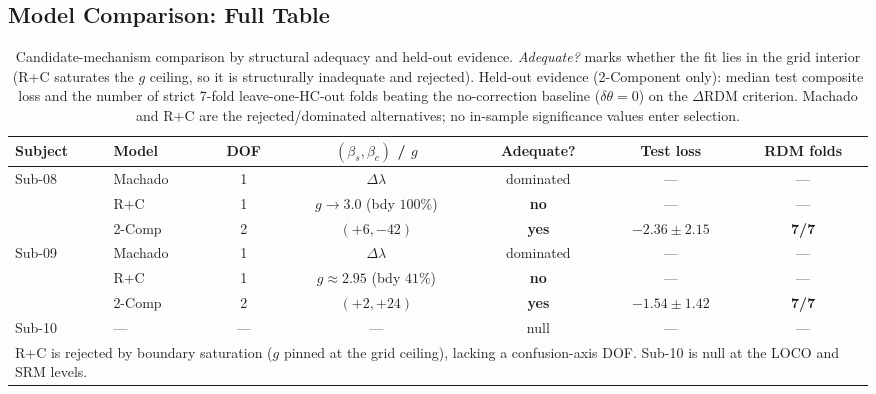 \documentclass{article}
\begin{document}
\subsection{Model Comparison: Full Table}

\begin{table}[h]
  \caption{Candidate-mechanism comparison by structural adequacy and held-out evidence. \emph{Adequate?} marks whether the fit lies in the grid interior (R+C saturates the $g$ ceiling, so it is structurally inadequate and rejected). Held-out evidence (2-Component only): median test composite loss and the number of strict 7-fold leave-one-HC-out folds beating the no-correction baseline ($\delta\theta{=}0$) on the $\Delta$RDM criterion. Machado and R+C are the rejected/dominated alternatives; no in-sample significance values enter selection.}
  \label{tab:full}
  \begin{center}
    \begin{small}
      \begin{tabular}{llccccc}
        \toprule
        Subject & Model & DOF & $(\beta_s, \beta_c)$ / $g$ & Adequate? & Test loss & RDM folds \\
        \midrule
        \multirow{3}{*}{Sub-08} & Machado & 1 & $\Delta\lambda$ & dominated & --- & --- \\
        & R+C & 1 & $g{\to}3.0$ (bdy $100\%$) & \textbf{no} & --- & --- \\
        & 2-Comp & 2 & $(+6, -42)$ & \textbf{yes} & $-2.36 \pm 2.15$ & \textbf{7/7} \\
        \midrule
        \multirow{3}{*}{Sub-09} & Machado & 1 & $\Delta\lambda$ & dominated & --- & --- \\
        & R+C & 1 & $g{\approx}2.95$ (bdy $41\%$) & \textbf{no} & --- & --- \\
        & 2-Comp & 2 & $(+2, +24)$ & \textbf{yes} & $-1.54 \pm 1.42$ & \textbf{7/7} \\
        \midrule
        Sub-10 & --- & --- & --- & null & --- & --- \\
        \bottomrule
        \multicolumn{7}{p{0.92\columnwidth}}{\small R+C is rejected by boundary saturation ($g$ pinned at the grid ceiling), lacking a confusion-axis DOF. Sub-10 is null at the LOCO and SRM levels.} \\
      \end{tabular}
    \end{small}
  \end{center}
\end{table}
\end{document}
